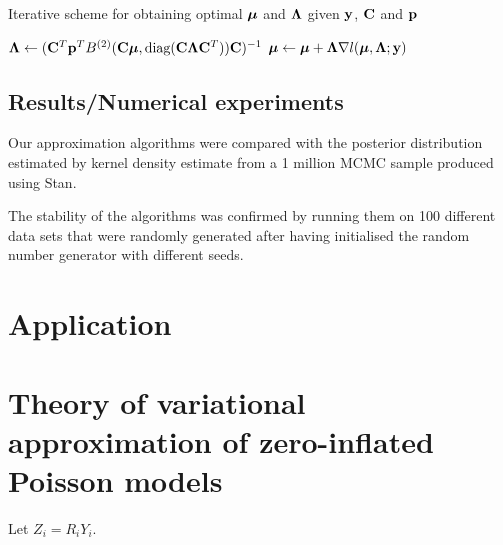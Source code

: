 \documentclass{article}[12pt]
\begin{document}

\begin{algorithm}\label{alg:algorithm_nr}
\label{algorithm_nr}
\caption[Algorithm GVA NR]{Iterative scheme for obtaining optimal ${\boldsymbol \mu}$ and ${\boldsymbol \Lambda}$
given ${\bf y}$, ${\bf C}$ and ${\bf p}$}
\begin{algorithmic}
\REQUIRE{}
\STATE ${\boldsymbol \Lambda} \leftarrow ({\bf C}^T{\bf p}^T B^{(2)}({\bf C} {\boldsymbol \mu}, \text{diag}({\bf C} {\boldsymbol \Lambda} {\bf C}^T)) {\bf C})^{-1}$
\STATE ${\boldsymbol \mu} \leftarrow {\boldsymbol\mu} + {\boldsymbol \Lambda} \nabla l({\boldsymbol \mu}, {\boldsymbol \Lambda}; {\bf y})$
\ENDWHILE
\end{algorithmic}
\end{algorithm}


\subsection{Results/Numerical experiments}

Our approximation algorithms were compared with the posterior distribution estimated
by kernel density estimate from a 1 million MCMC sample produced using Stan.

The stability of the algorithms was confirmed by running them on 100 different
data sets that were randomly generated after having initialised the random number
generator with different seeds.



\section{Application}

\section{Theory of variational approximation of zero-inflated Poisson models}
Let $Z_i = R_i Y_i$.
\end{document}
